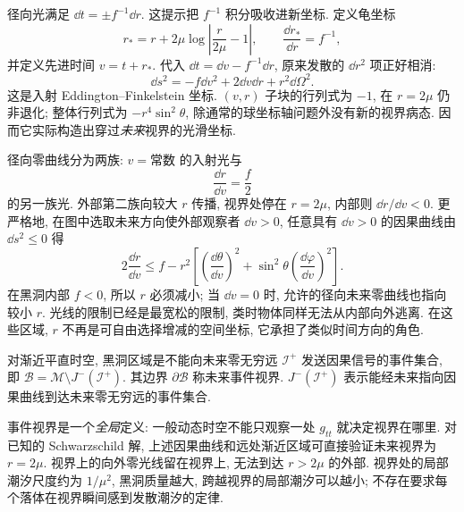 
径向光满足 $\dd t=\pm f^{-1}\dd r$. 这提示把 $f^{-1}$ 积分吸收进新坐标. 定义龟坐标
\begin{equation}
 r_*=r+2\mu\log\left|\frac r{2\mu}-1\right|,
 \qquad \frac{\dd r_*}{\dd r}=f^{-1},
 \label{eq:gr-tortoise}
\end{equation}
并定义先进时间 $v=t+r_*$. 代入 $\dd t=\dd v-f^{-1}\dd r$, 原来发散的 $\dd r^2$ 项正好相消:
\begin{equation}
 \dd s^2=-f\dd v^2+2\dd v\dd r+r^2\dd\Omega^2.
 \label{eq:gr-ef}
\end{equation}
这是入射 Eddington--Finkelstein 坐标. $(v,r)$ 子块的行列式为 $-1$, 在 $r=2\mu$ 仍非退化; 整体行列式为 $-r^4\sin^2\theta$, 除通常的球坐标轴问题外没有新的视界病态. 因而它实际构造出穿过\emph{未来}视界的光滑坐标.

径向零曲线分为两族: $v=\text{常数}$ 的入射光与
\begin{equation}
 \frac{\dd r}{\dd v}=\frac f2
 \label{eq:gr-ef-light}
\end{equation}
的另一族光. 外部第二族向较大 $r$ 传播, 视界处停在 $r=2\mu$, 内部则 $\dd r/\dd v<0$. 更严格地, 在图中选取未来方向使外部观察者 $\dd v>0$, 任意具有 $\dd v>0$ 的因果曲线由 $\dd s^2\le0$ 得
\[
 2\frac{\dd r}{\dd v}
 \le f-r^2\left[\left(\frac{\dd\theta}{\dd v}\right)^2
       +\sin^2\theta\left(\frac{\dd\varphi}{\dd v}\right)^2\right].
\]
在黑洞内部 $f<0$, 所以 $r$ 必须减小; 当 $\dd v=0$ 时, 允许的径向未来零曲线也指向较小 $r$. 光线的限制已经是最宽松的限制, 类时物体同样无法从内部向外逃离. 在这些区域, $r$ 不再是可自由选择增减的空间坐标, 它承担了类似时间方向的角色.

\begin{definition}
 对渐近平直时空, 黑洞区域是不能向未来零无穷远 $\mathscr I^+$ 发送因果信号的事件集合, 即 $\mathcal B=\mathcal M\setminus J^-(\mathscr I^+)$. 其边界 $\partial\mathcal B$ 称未来事件视界. $J^-(\mathscr I^+)$ 表示能经未来指向因果曲线到达未来零无穷远的事件集合.
\end{definition}

事件视界是一个\emph{全局}定义: 一般动态时空不能只观察一处 $g_{tt}$ 就决定视界在哪里. 对已知的 Schwarzschild 解, 上述因果曲线和远处渐近区域可直接验证未来视界为 $r=2\mu$. 视界上的向外零光线留在视界上, 无法到达 $r>2\mu$ 的外部. 视界处的局部潮汐尺度约为 $1/\mu^2$, 黑洞质量越大, 跨越视界的局部潮汐可以越小; 不存在要求每个落体在视界瞬间感到发散潮汐的定律.


